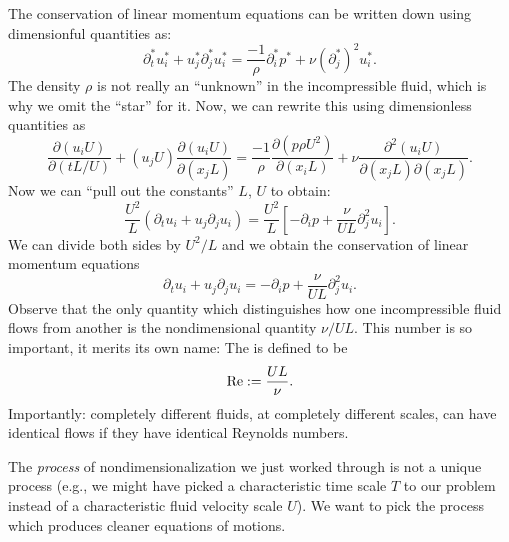 \begin{node}
The conservation of linear momentum equations can be written down
using dimensionful quantities as:
\begin{equation}
\partial_{t}^{*}u_{i}^{*}+u_{j}^{*}\partial^{*}_{j}u^{*}_{i}=\frac{-1}{\rho}\partial^{*}_{i}p^{*}+\nu(\partial_{j}^{*})^{2}u^{*}_{i}.
\end{equation}
The density $\rho$ is not really an ``unknown'' in the incompressible
fluid, which is why we omit the ``star'' for it. Now, we can rewrite
this using dimensionless quantities as
\begin{equation}
\frac{\partial(u_{i}U)}{\partial(tL/U)}+(u_{j}U)\frac{\partial(u_{i}U)}{\partial(x_{j}L)}=\frac{-1}{\rho}\frac{\partial(p\rho
U^{2})}{\partial(x_{i}L)} + \nu\frac{\partial^{2}(u_{i}U)}{\partial(x_{j}L)\partial(x_{j}L)}.
\end{equation}
Now we can ``pull out the constants'' $L$, $U$ to obtain:
\begin{equation}
\frac{U^{2}}{L}(\partial_{t}u_{i}+u_{j}\partial_{j}u_{i})=\frac{U^{2}}{L}[-\partial_{i}p+\frac{\nu}{UL}\partial_{j}^{2}u_{i}].
\end{equation}
We can divide both sides by $U^{2}/L$ and we obtain the conservation
of linear momentum equations
\begin{equation}
\partial_{t}u_{i}+u_{j}\partial_{j}u_{i}=-\partial_{i}p+\frac{\nu}{UL}\partial_{j}^{2}u_{i}.
\end{equation}
Observe that the only quantity which distinguishes how one
incompressible fluid flows from another is the nondimensional
quantity $\nu/UL$. This number is so important, it merits its own
name: The  is defined to be
\begin{equation}
\mathrm{Re} := \frac{UL}{\nu}.
\end{equation}
Importantly: completely different fluids, at completely different
scales, can have identical flows if they have identical Reynolds numbers.
\end{node}

\begin{remark}
The \emph{process} of nondimensionalization we just worked through is
not a unique process (e.g., we might have picked a characteristic time
scale $T$ to our problem instead of a characteristic fluid velocity
scale $U$). We want to pick the process which produces 
cleaner equations of motions.
\end{remark}

